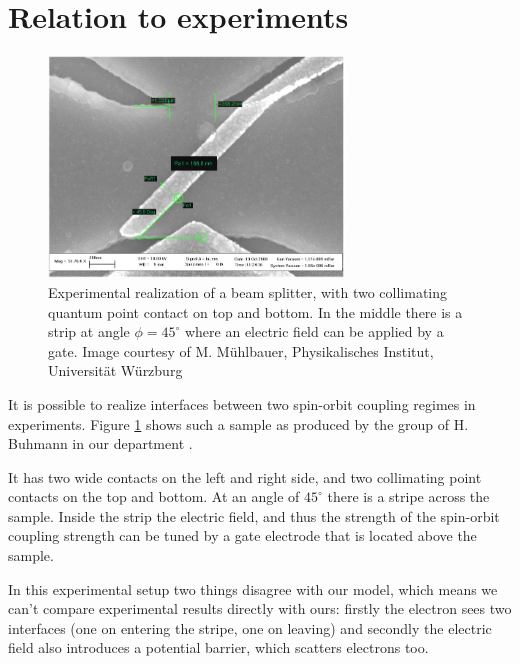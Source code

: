 \section{Relation to experiments}

\begin{figure}[htb]
    \begin{center}
        \includegraphics[width=0.7\textwidth]{beamsplitter2.jpg}
    \end{center}
    \caption{Experimental realization of a beam splitter, with two
        collimating quantum point contact on top and bottom. In the middle
        there is a strip at angle $\phi = 45^\circ$ where an electric field
        can be applied by a gate. Image courtesy of M. Mühlbauer,
        Physikalisches Institut, Universität Würzburg}
    \label{fig:experiment}
\end{figure}

It is possible to realize interfaces between two spin-orbit coupling regimes
in experiments. Figure \ref{fig:experiment} shows such a sample as produced
by the group of H. Buhmann in our department \cite{mathias}.

It has two wide contacts on the left and right side, and two collimating point
contacts on the top and bottom. At an angle of $45^{\circ}$ there is a stripe
across the sample. Inside the strip the electric field, and thus the strength
of the spin-orbit coupling strength can be tuned by a gate electrode that is
located above the sample.

In this experimental setup two things disagree with our model, which
means we can't compare experimental results directly with ours: firstly the
electron sees two interfaces (one on entering the stripe, one on leaving) and
secondly the electric field also introduces a potential barrier, which
scatters electrons too.


